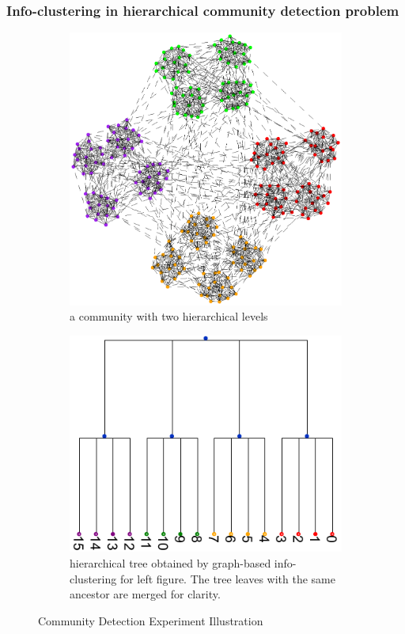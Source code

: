 \documentclass[notheorems]{beamer}
\begin{document}
\begin{frame}
\frametitle{Info-clustering in hierarchical community detection problem}
\begin{figure}
	\centering
	\begin{subfigure}{0.45\textwidth}
		\includegraphics[width=\textwidth]{pic/two_level.eps}
		\caption{a community with two hierarchical levels}\label{fig:c1}
	\end{subfigure}
	\begin{subfigure}{0.45\textwidth}
		\includegraphics[width=\textwidth]{pic/tree_info-clustering.pdf}
		\caption{hierarchical tree obtained by graph-based info-clustering for left figure. The tree leaves with the same ancestor are merged for clarity.}\label{fig:c2}
	\end{subfigure}
	\caption{Community Detection Experiment Illustration}
\end{figure}
\end{frame}
\end{document}
